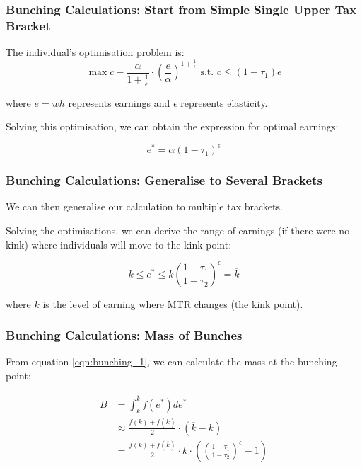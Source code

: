             \subsubsection{Bunching Calculations: Start from Simple Single Upper Tax Bracket}

                The individual's optimisation problem is:
                $$
                \max c - \frac{\alpha}{1+\frac{1}{\epsilon}} \cdot \left( \frac{e}{\alpha} \right)^{1+\frac{1}{\epsilon}} \text{ s.t. } c \leq (1-\tau_1)e
                $$

                where $e=wh$ represents earnings and $\epsilon$ represents elasticity.

                Solving this optimisation, we can obtain the expression for optimal earnings:

                \begin{equation*}
                    e^\ast = \alpha (1-\tau_1)^\epsilon
                \end{equation*}
                
            \subsubsection{Bunching Calculations: Generalise to Several Brackets}

                We can then generalise our calculation to multiple tax brackets.

                Solving the optimisations, we can derive the range of earnings (if there were no kink) where individuals will move to the kink point:

                \begin{equation}
                    k \leq e^\ast \leq k \left( \frac{1-\tau_1}{1-\tau_2} \right)^\epsilon = \overline{k}
                    \label{eqn:bunching_1}
                \end{equation}

                where $k$ is the level of earning where MTR changes (the kink point).

            \subsubsection{Bunching Calculations: Mass of Bunches}

                From equation \ref{eqn:bunching_1}, we can calculate the mass at the bunching point:

                \begin{align*}
                    B &= \int_{k}^{\overline{k}} f(e^\ast) de^\ast \\
                    &\approx \frac{f(k)+f(\overline{k})}{2} \cdot (\overline{k}-k) \\
                    &= \frac{f(k)+f(\overline{k})}{2} \cdot k \cdot \left( \left( \frac{1-\tau_1}{1-\tau_2} \right)^\epsilon - 1 \right)
                \end{align*}


